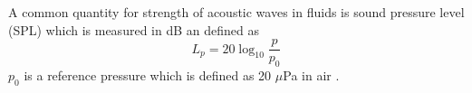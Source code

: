 \documentclass[11pt,twoside]{eitExjobb}
\begin{document}
%	
	
	A common quantity for strength of acoustic waves in fluids is sound pressure level (SPL) which is measured in dB an defined as
	\begin{equation*}
		L_p = 20 \log_{10}{\frac{p}{p_0}}
	\end{equation*}
	$p_0$ is a reference pressure which is defined as 20 $\mu$Pa in air \cite{Rossing2014}.
	
\end{document}
